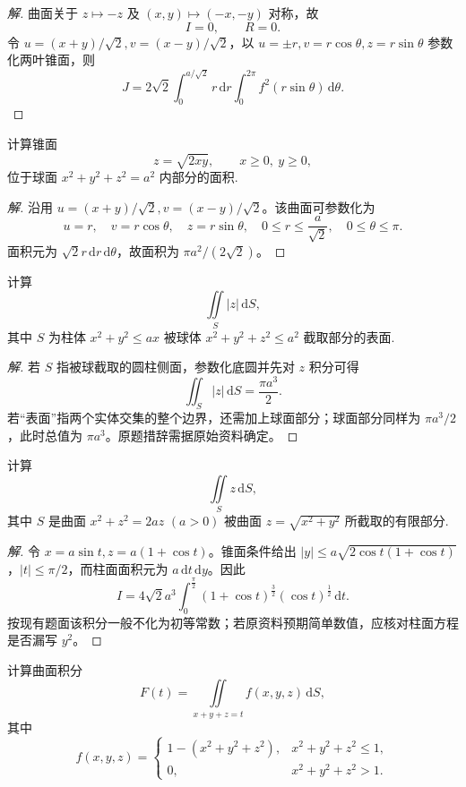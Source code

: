 \documentclass[../../数学分析培优讲义(答案版).tex]{subfiles}
\begin{document}
\begin{proof}[解]
曲面关于 $z\mapsto-z$ 及 $(x,y)\mapsto(-x,-y)$ 对称，故
\[
I=0,\qquad R=0.
\]
令 $u=(x+y)/\sqrt{2},v=(x-y)/\sqrt{2}$，以
$u=\pm r,v=r\cos\theta,z=r\sin\theta$ 参数化两叶锥面，则
\[
J=2\sqrt{2}\int_0^{a/\sqrt{2}}\!r\,\mathrm{d}r
\int_0^{2\pi}f^2(r\sin\theta)\,\mathrm{d}\theta.
\]
\end{proof}

\begin{example}
计算锥面
\[
    z=\sqrt{2xy},\qquad x\geq0,\ y\geq0,
\]
位于球面 $x^2+y^2+z^2=a^2$ 内部分的面积.
\end{example}

\begin{proof}[解]
沿用 $u=(x+y)/\sqrt{2},v=(x-y)/\sqrt{2}$。该曲面可参数化为
\[
u=r,\quad v=r\cos\theta,\quad z=r\sin\theta,\quad
0\leq r\leq\dfrac{a}{\sqrt{2}},\quad0\leq\theta\leq\pi.
\]
面积元为 $\sqrt{2}r\,\mathrm{d}r\,\mathrm{d}\theta$，故面积为 $\pi a^2/(2\sqrt{2})$。
\end{proof}

\begin{example}
计算
\[
    \iint\limits_S|z|\,\mathrm{d}S,
\]
其中 $S$ 为柱体 $x^2+y^2\leq ax$ 被球体 $x^2+y^2+z^2\leq a^2$ 截取部分的表面.
\end{example}

\begin{proof}[解]
若 $S$ 指被球截取的圆柱侧面，参数化底圆并先对 $z$ 积分可得
\[
\iint_S|z|\,\mathrm{d}S=\dfrac{\pi a^3}{2}.
\]
若“表面”指两个实体交集的整个边界，还需加上球面部分；球面部分同样为 $\pi a^3/2$，此时总值为 $\pi a^3$。原题措辞需据原始资料确定。
\end{proof}

\begin{example}
计算
\[
    \iint\limits_Sz\,\mathrm{d}S,
\]
其中 $S$ 是曲面 $x^2+z^2=2az$ $(a>0)$ 被曲面 $z=\sqrt{x^2+y^2}$ 所截取的有限部分.
\end{example}

\begin{proof}[解]
令 $x=a\sin t,z=a(1+\cos t)$。锥面条件给出
$|y|\leq a\sqrt{2\cos t(1+\cos t)}$，$|t|\leq\pi/2$，而柱面面积元为 $a\,\mathrm{d}t\,\mathrm{d}y$。因此
\[
I=4\sqrt{2}a^3\int_0^{\frac{\pi}{2}}(1+\cos t)^{\frac{3}{2}}(\cos t)^{\frac{1}{2}}\,\mathrm{d}t.
\]
按现有题面该积分一般不化为初等常数；若原资料预期简单数值，应核对柱面方程是否漏写 $y^2$。
\end{proof}

\begin{example}
计算曲面积分
\[
    F(t)=\iint\limits_{x+y+z=t}f(x,y,z)\,\mathrm{d}S,
\]
其中
\[
    f(x,y,z)=
    \begin{cases}
        1-(x^2+y^2+z^2), & x^2+y^2+z^2\leq1,\\
        0, & x^2+y^2+z^2>1.
    \end{cases}
\]
\end{example}
\end{document}
